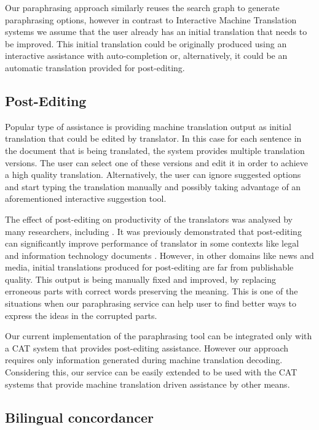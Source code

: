 Our paraphrasing approach similarly reuses the search graph to generate paraphrasing options, however in contrast to Interactive Machine Translation systems we assume that the user already has an initial translation that needs to be improved. This initial translation could be originally produced using an interactive assistance with auto-completion or, alternatively, it could be an automatic translation provided for post-editing.

\subsection{Post-Editing}

Popular type of assistance is providing machine translation output as initial translation that could be edited by translator. In this case for each sentence in the document that is being translated, the system provides multiple translation versions. The user can select one of these versions and edit it in order to achieve a high quality translation. Alternatively, the user can ignore suggested options and start typing the translation manually and possibly taking advantage of an aforementioned interactive suggestion tool.  

The effect of post-editing on productivity of the translators was analysed by many researchers, including \cite{guerberof2009productivity}. It was previously demonstrated that post-editing can significantly improve performance of translator in some contexts like legal and information technology documents \citep{federico2012measuring}. However, in other domains like news and media, initial translations produced for post-editing are far from publishable quality. This output is being manually fixed and improved, by replacing erroneous parts with correct words preserving the meaning. This is one of the situations when our paraphrasing service can help user to find better ways to express the ideas in the corrupted parts.

Our current implementation of the paraphrasing tool can be integrated only with a CAT system that provides post-editing assistance. However our approach requires only information generated during machine translation decoding. Considering this, our service can be easily extended to be used with the CAT systems that provide machine translation driven assistance by other means.

\subsection{Bilingual concordancer}

